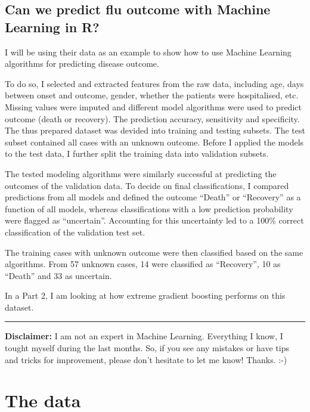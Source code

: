 \documentclass[]{book}
\begin{document}
\hypertarget{can-we-predict-flu-outcome-with-machine-learning-in-r}{%
\subsection{Can we predict flu outcome with Machine Learning in R?}\label{can-we-predict-flu-outcome-with-machine-learning-in-r}}

I will be using their data as an example to show how to use Machine Learning algorithms for predicting disease outcome.

To do so, I selected and extracted features from the raw data, including age, days between onset and outcome, gender, whether the patients were hospitalised, etc. Missing values were imputed and different model algorithms were used to predict outcome (death or recovery). The prediction accuracy, sensitivity and specificity. The thus prepared dataset was devided into training and testing subsets. The test subset contained all cases with an unknown outcome. Before I applied the models to the test data, I further split the training data into validation subsets.

The tested modeling algorithms were similarly successful at predicting the outcomes of the validation data. To decide on final classifications, I compared predictions from all models and defined the outcome ``Death'' or ``Recovery'' as a function of all models, whereas classifications with a low prediction probability were flagged as ``uncertain''. Accounting for this uncertainty led to a 100\% correct classification of the validation test set.

The training cases with unknown outcome were then classified based on the same algorithms. From 57 unknown cases, 14 were classified as ``Recovery'', 10 as ``Death'' and 33 as uncertain.

In a Part 2, I am looking at how extreme gradient boosting performs on this dataset.

\begin{center}\rule{0.5\linewidth}{\linethickness}\end{center}

\textbf{Disclaimer:} I am not an expert in Machine Learning. Everything I know, I tought myself during the last months. So, if you see any mistakes or have tips and tricks for improvement, please don't hesitate to let me know! Thanks. :-)

\hypertarget{the-data}{%
\section{The data}\label{the-data}}
\end{document}
